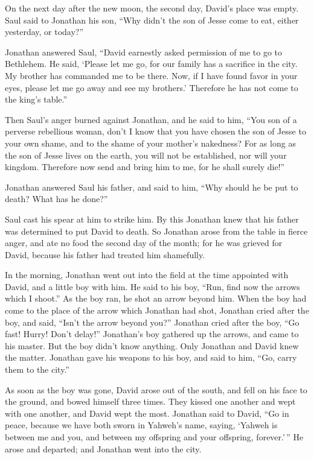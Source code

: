  On the next day after the new moon, the second day,
David's place was empty. Saul said to Jonathan his son, ``Why didn't the
son of Jesse come to eat, either yesterday, or today?''

 Jonathan answered Saul, ``David earnestly asked
permission of me to go to Bethlehem.  He said, `Please
let me go, for our family has a sacrifice in the city. My brother has
commanded me to be there. Now, if I have found favor in your eyes,
please let me go away and see my brothers.' Therefore he has not come to
the king's table.''

 Then Saul's anger burned against Jonathan, and he said
to him, ``You son of a perverse rebellious woman, don't I know that you
have chosen the son of Jesse to your own shame, and to the shame of your
mother's nakedness?  For as long as the son of Jesse
lives on the earth, you will not be established, nor will your kingdom.
Therefore now send and bring him to me, for he shall surely die!''

 Jonathan answered Saul his father, and said to him,
``Why should he be put to death? What has he done?''

 Saul cast his spear at him to strike him. By this
Jonathan knew that his father was determined to put David to death.
 So Jonathan arose from the table in fierce anger, and
ate no food the second day of the month; for he was grieved for David,
because his father had treated him shamefully.

 In the morning, Jonathan went out into the field at the
time appointed with David, and a little boy with him.  He
said to his boy, ``Run, find now the arrows which I shoot.'' As the boy
ran, he shot an arrow beyond him.  When the boy had come
to the place of the arrow which Jonathan had shot, Jonathan cried after
the boy, and said, ``Isn't the arrow beyond you?'' 
Jonathan cried after the boy, ``Go fast! Hurry! Don't delay!''
Jonathan's boy gathered up the arrows, and came to his master.
 But the boy didn't know anything. Only Jonathan and
David knew the matter.  Jonathan gave his weapons to his
boy, and said to him, ``Go, carry them to the city.''

 As soon as the boy was gone, David arose out of the
south, and fell on his face to the ground, and bowed himself three
times. They kissed one another and wept with one another, and David wept
the most.  Jonathan said to David, ``Go in peace, because
we have both sworn in Yahweh's name, saying, `Yahweh is between me and
you, and between my offspring and your offspring, forever.'\,'' He arose
and departed; and Jonathan went into the city.

